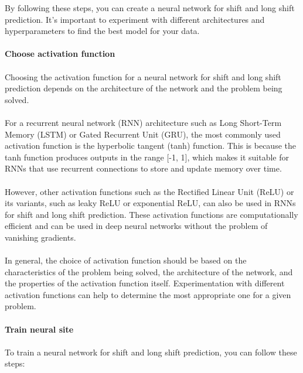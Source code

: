         By following these steps, you can create a neural network for shift and long shift prediction. It's important to experiment with different
        architectures and hyperparameters to find the best model for your data.\\
        \\
        \textbf{Choose activation function}\\
        \\
        Choosing the activation function for a neural network for shift and long shift prediction depends on the architecture of the
        network and the problem being solved.\\
        \\
        For a recurrent neural network (RNN) architecture such as Long Short-Term Memory (LSTM) or Gated Recurrent Unit (GRU), the most commonly
        used activation function is the hyperbolic tangent (tanh) function. This is because the tanh function produces outputs in the range [-1, 1],
        which makes it suitable for RNNs that use recurrent connections to store and update memory over time.\\
        \\
        However, other activation functions such as the Rectified Linear Unit (ReLU) or its variants, such as leaky ReLU or exponential ReLU,
        can also be used in RNNs for shift and long shift prediction. These activation functions are computationally efficient and can be
        used in deep neural networks without the problem of vanishing gradients.\\
        \\
        In general, the choice of activation function should be based on the characteristics of the problem being solved, the architecture of the network,
        and the properties of the activation function itself. Experimentation with different activation functions can help to determine the most
        appropriate one for a given problem.\\
        \\
        \textbf{Train neural site}\\
        \\
        To train a neural network for shift and long shift prediction, you can follow these steps:
